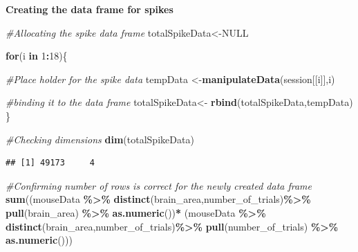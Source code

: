 \documentclass[
]{article}
\newenvironment{Shaded}{\begin{snugshade}}{\end{snugshade}}
\newcommand{\CommentTok}[1]{\textcolor[rgb]{0.56,0.35,0.01}{\textit{#1}}}
\newcommand{\ConstantTok}[1]{\textcolor[rgb]{0.56,0.35,0.01}{#1}}
\newcommand{\ControlFlowTok}[1]{\textcolor[rgb]{0.13,0.29,0.53}{\textbf{#1}}}
\newcommand{\DecValTok}[1]{\textcolor[rgb]{0.00,0.00,0.81}{#1}}
\newcommand{\FunctionTok}[1]{\textcolor[rgb]{0.13,0.29,0.53}{\textbf{#1}}}
\newcommand{\NormalTok}[1]{#1}
\newcommand{\OtherTok}[1]{\textcolor[rgb]{0.56,0.35,0.01}{#1}}
\newcommand{\SpecialCharTok}[1]{\textcolor[rgb]{0.81,0.36,0.00}{\textbf{#1}}}
\begin{document}
\begin{Shaded}
\end{Shaded}

\textbf{Creating the data frame for spikes}

\begin{Shaded}
\begin{Highlighting}[]
\CommentTok{\#Allocating the spike data frame}
\NormalTok{totalSpikeData}\OtherTok{\textless{}{-}}\ConstantTok{NULL}

\ControlFlowTok{for}\NormalTok{(i }\ControlFlowTok{in} \DecValTok{1}\SpecialCharTok{:}\DecValTok{18}\NormalTok{)\{}
  
  \CommentTok{\#Place holder for the spike data}
\NormalTok{  tempData }\OtherTok{\textless{}{-}}\FunctionTok{manipulateData}\NormalTok{(session[[i]],i)}
  
  
  \CommentTok{\#binding it to the data frame}
\NormalTok{  totalSpikeData}\OtherTok{\textless{}{-}} \FunctionTok{rbind}\NormalTok{(totalSpikeData,tempData)}
\NormalTok{\}}


\CommentTok{\#Checking dimensions}
\FunctionTok{dim}\NormalTok{(totalSpikeData)}
\end{Highlighting}
\end{Shaded}

\begin{verbatim}
## [1] 49173     4
\end{verbatim}

\begin{Shaded}
\begin{Highlighting}[]
\CommentTok{\#Confirming number of rows is correct for the newly created data frame}
\FunctionTok{sum}\NormalTok{((mouseData }\SpecialCharTok{\%\textgreater{}\%} \FunctionTok{distinct}\NormalTok{(brain\_area,number\_of\_trials)}\SpecialCharTok{\%\textgreater{}\%} \FunctionTok{pull}\NormalTok{(brain\_area) }\SpecialCharTok{\%\textgreater{}\%} \FunctionTok{as.numeric}\NormalTok{())}\SpecialCharTok{*}\NormalTok{ (mouseData }\SpecialCharTok{\%\textgreater{}\%} \FunctionTok{distinct}\NormalTok{(brain\_area,number\_of\_trials)}\SpecialCharTok{\%\textgreater{}\%} \FunctionTok{pull}\NormalTok{(number\_of\_trials) }\SpecialCharTok{\%\textgreater{}\%} \FunctionTok{as.numeric}\NormalTok{()))}
\end{Highlighting}
\end{Shaded}
\end{document}
